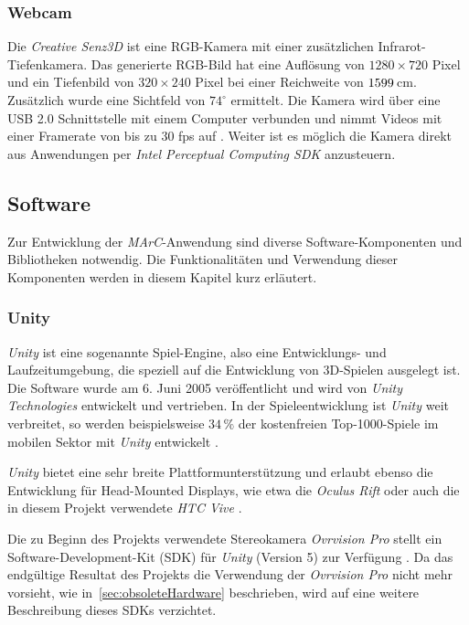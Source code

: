 \subsubsection{Webcam}\label{sec:webcam}%
Die \textit{Creative Senz3D} ist eine RGB-Kamera mit einer zusätzlichen Infra\-rot-Tie\-fen\-ka\-me\-ra. Das generierte RGB-Bild hat eine Auflösung von $1280\times720$ Pixel und ein Tiefenbild von $320\times240$ Pixel bei einer Reichweite von $15\-99\,$cm. Zusätzlich wurde eine Sichtfeld von $74^\circ$ ermittelt. Die Kamera wird über eine USB 2.0 Schnittstelle mit einem Computer verbunden und nimmt Videos mit einer Framerate von bis zu $30$ fps auf \cite{website:Senz3d}. Weiter ist es möglich die Kamera direkt aus Anwendungen per \textit{Intel Perceptual Computing SDK} anzusteuern.

\subsection{Software}%
Zur Entwicklung der \textit{MArC}-Anwendung sind diverse Software-Komponenten und Bibliotheken notwendig. Die Funktionalitäten und Verwendung dieser Komponenten werden in diesem Kapitel kurz erläutert.

\subsubsection{Unity}\label{sec:unity}%
\emph{Unity} ist eine sogenannte Spiel-Engine, also eine Entwicklungs- und Laufzeitumgebung, die speziell auf die Entwicklung von 3D-Spielen ausgelegt ist. Die Software wurde am 6. Juni 2005 veröffentlicht \cite{haas2014history} und wird von \textit{Unity Technologies} \cite{website:Unity} entwickelt und vertrieben. In der Spieleentwicklung ist \textit{Unity} weit verbreitet, so werden beispielsweise $34\,\%$ der kostenfreien Top-1000-Spiele im mobilen Sektor mit \textit{Unity} entwickelt \cite{website:UnityPR}.

\emph{Unity} bietet eine sehr breite Plattformunterstützung \cite{website:UnityMultiPlatform} und erlaubt ebenso die Entwicklung für Head-Mounted Displays, wie etwa die \textit{Oculus Rift} \cite{website:UnityOculus}\cite{website:UnityVRoverview} oder auch die in diesem Projekt verwendete \textit{HTC Vive} \cite{website:UnityVRoverview}.

Die zu Beginn des Projekts verwendete Stereokamera \emph{Ovrvision Pro} stellt ein Software-Development-Kit (SDK) für \textit{Unity} (Version 5) zur Verfügung \cite{website:ovrvisionSetup}. Da das endgültige Resultat des Projekts die Verwendung der \emph{Ovrvision Pro} nicht mehr vorsieht, wie in~\ref{sec:obsoleteHardware} beschrieben, wird auf eine weitere Beschreibung dieses SDKs verzichtet.


